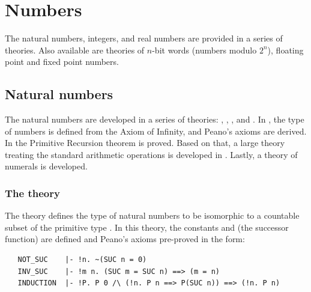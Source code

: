 \section{Numbers}

The natural numbers, integers, and real numbers are provided in a
series of theories. Also available are theories of $n$-bit words
(numbers modulo $2^n$), floating point and fixed point numbers.

\subsection{Natural numbers}

The natural numbers are developed in a series of theories:
, , , and
. In , the type of numbers is
defined from the Axiom of Infinity, and Peano's axioms are derived. In
 the Primitive Recursion theorem is proved. Based
on that, a large theory treating the standard arithmetic operations is
developed in . Lastly, a theory of numerals is
developed.

\subsubsection{The theory }

The theory 
defines the type  of natural numbers to be
isomorphic to a countable subset of the primitive type .  In this
theory, the constants 
and  (the successor function) are defined
and Peano's axioms
pre-proved in the form:

\begin{hol}
\begin{verbatim}
   NOT_SUC    |- !n. ~(SUC n = 0)
   INV_SUC    |- !m n. (SUC m = SUC n) ==> (m = n)
   INDUCTION  |- !P. P 0 /\ (!n. P n ==> P(SUC n)) ==> (!n. P n)
\end{verbatim}
\end{hol}


